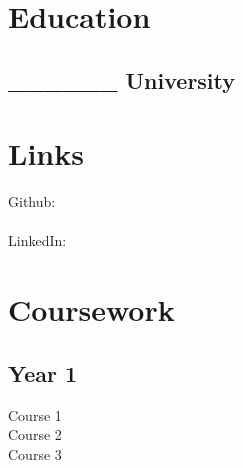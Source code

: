 \documentclass[]{deedy-resume-openfont}
\begin{document}
%
%



%
%

\begin{minipage}[t]{0.33\textwidth}


\section{Education}

\subsection{______ University} %
\sectionsep


\section{Links}
Github:\\ \href{https://github.com/____}{} \\
LinkedIn: \href{https://www.linkedin.com/_____}{\custombold{_________}} \\
\sectionsep


\section{Coursework}
\subsection{Year 1}
Course 1 \\
Course 2 \\
Course 3
\sectionsep


\end{minipage}
\end{document}
